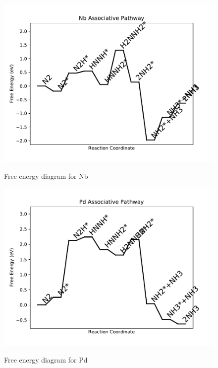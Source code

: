 \documentclass{article}
\begin{document}
\newpage
\begin{figure}
\includegraphics[width=1\linewidth]{data/plots/Nb_associative.pdf}
\label{fig:Nb_associative}
\caption{Free energy diagram for Nb}
\end{figure}

\begin{figure}
\includegraphics[width=1\linewidth]{data/plots/Pd_associative.pdf}
\label{fig:Pd_associative}
\caption{Free energy diagram for Pd}
\end{figure}
\end{document}
